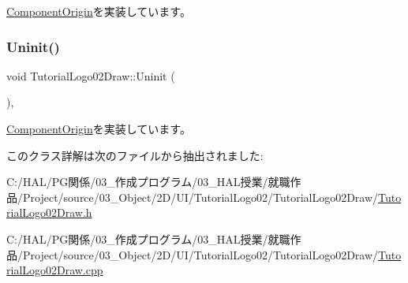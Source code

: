 \mbox{\hyperlink{class_component_origin_a9f674891257f2272b1636d8b6bb05d81}{Component\+Origin}}を実装しています。

\mbox{\label{class_tutorial_logo02_draw_a9eec09783781876d354c51d4f2acf2cd}} 
\subsubsection{\texorpdfstring{Uninit()}{Uninit()}}
{\footnotesize\ttfamily void Tutorial\+Logo02\+Draw\+::\+Uninit (\begin{DoxyParamCaption}{ }\end{DoxyParamCaption})\hspace{0.3cm}{\ttfamily [override]}, {\ttfamily [virtual]}}



\mbox{\hyperlink{class_component_origin_a9f89a93f9c1954bd53f9750e35e6089d}{Component\+Origin}}を実装しています。



このクラス詳解は次のファイルから抽出されました\+:\begin{DoxyCompactItemize}
\item 
C\+:/\+H\+A\+L/\+P\+G関係/03\+\_\+作成プログラム/03\+\_\+\+H\+A\+L授業/就職作品/\+Project/source/03\+\_\+\+Object/2\+D/\+U\+I/\+Tutorial\+Logo02/\+Tutorial\+Logo02\+Draw/\mbox{\hyperlink{_tutorial_logo02_draw_8h}{Tutorial\+Logo02\+Draw.\+h}}\item 
C\+:/\+H\+A\+L/\+P\+G関係/03\+\_\+作成プログラム/03\+\_\+\+H\+A\+L授業/就職作品/\+Project/source/03\+\_\+\+Object/2\+D/\+U\+I/\+Tutorial\+Logo02/\+Tutorial\+Logo02\+Draw/\mbox{\hyperlink{_tutorial_logo02_draw_8cpp}{Tutorial\+Logo02\+Draw.\+cpp}}\end{DoxyCompactItemize}
